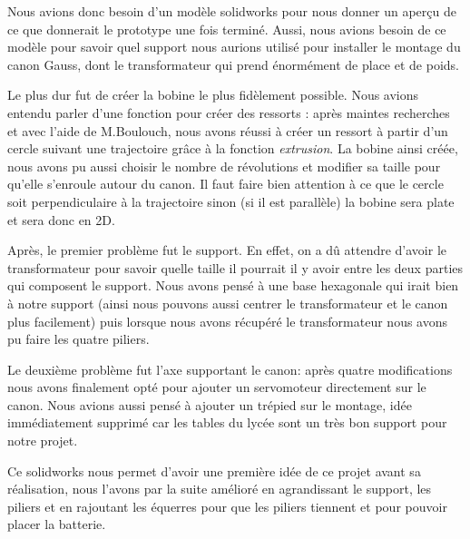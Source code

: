 Nous avions donc besoin d'un modèle solidworks pour nous donner un aperçu de ce que donnerait le prototype une fois terminé. Aussi, nous avions besoin de ce modèle pour savoir quel support nous aurions utilisé pour installer le montage du canon Gauss, dont le transformateur qui prend énormément de place et de poids.

Le plus dur fut de créer la bobine le plus fidèlement possible. Nous avions entendu parler d'une fonction pour créer des ressorts : après maintes recherches et avec l'aide de M.Boulouch, nous avons réussi à créer un ressort à partir d'un cercle suivant une trajectoire grâce à la fonction \emph{extrusion}. La bobine ainsi créée, nous avons pu aussi choisir le nombre de révolutions et modifier sa taille pour qu'elle s'enroule autour du canon. Il faut faire bien attention à ce que le cercle soit perpendiculaire à la trajectoire sinon (si il est parallèle) la bobine sera plate et sera donc en 2D. 

Après, le premier problème fut le support. En effet, on a dû attendre d'avoir le transformateur pour savoir quelle taille il pourrait il y avoir entre les deux parties qui composent le support. Nous avons pensé à une base hexagonale qui irait bien à notre support (ainsi nous pouvons aussi centrer le transformateur et le canon plus facilement) puis lorsque nous avons récupéré le transformateur nous avons pu faire les quatre piliers.

Le deuxième problème fut l'axe supportant le canon: après quatre modifications nous avons finalement opté pour ajouter un servomoteur directement sur le canon. Nous avions aussi pensé à ajouter un trépied sur le montage, idée immédiatement supprimé car les tables du lycée sont un très bon support pour notre projet.

Ce solidworks nous permet d'avoir une première idée de ce projet avant sa réalisation, nous l'avons par la suite amélioré en agrandissant le support, les piliers et en rajoutant les équerres pour que les piliers tiennent et pour pouvoir placer la batterie. 
